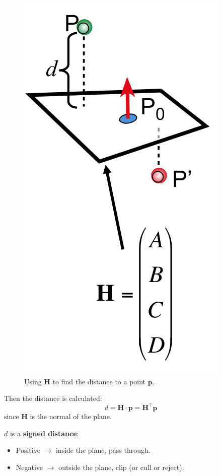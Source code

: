\documentclass[11pt]{article}
\begin{document}
\begin{figure}[htb!]
  \caption{Using $\bm{H}$ to find the distance to a point $\bm{p}$.}
  \includegraphics[scale=0.3]{signeddistance}
  \centering
\end{figure}

Then the distance is calculated:
\[
  d = \bm{H} \cdot \bm{p} = \bm{H}^\intercal \bm{p} 
\]
since $\bm{H}$ is the normal of the plane.

$d$ is a \textbf{signed distance}:
\begin{itemize}
  \item Positive $\rightarrow$ inside the plane, pass through.
  \item Negative $\rightarrow$ outside the plane, clip (or cull or reject).
\end{itemize}
\end{document}

